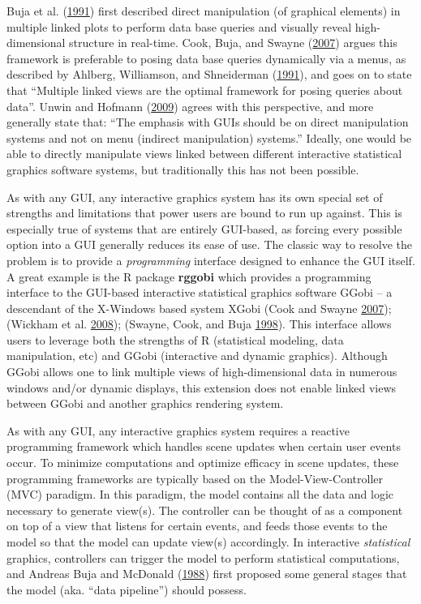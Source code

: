 \documentclass[12pt,]{isuthesis}
\begin{document}
Buja et al. (\protect\hyperlink{ref-Buja:1991vh}{1991}) first described
direct manipulation (of graphical elements) in multiple linked plots to
perform data base queries and visually reveal high-dimensional structure
in real-time. Cook, Buja, and Swayne
(\protect\hyperlink{ref-Cook:2007uk}{2007}) argues this framework is
preferable to posing data base queries dynamically via a menus, as
described by Ahlberg, Williamson, and Shneiderman
(\protect\hyperlink{ref-Ahlberg:1991}{1991}), and goes on to state that
``Multiple linked views are the optimal framework for posing queries
about data''. Unwin and Hofmann
(\protect\hyperlink{ref-Unwin:1999vp}{2009}) agrees with this
perspective, and more generally state that: ``The emphasis with GUIs
should be on direct manipulation systems and not on menu (indirect
manipulation) systems.'' Ideally, one would be able to directly
manipulate views linked between different interactive statistical
graphics software systems, but traditionally this has not been possible.

As with any GUI, any interactive graphics system has its own special set
of strengths and limitations that power users are bound to run up
against. This is especially true of systems that are entirely GUI-based,
as forcing every possible option into a GUI generally reduces its ease
of use. The classic way to resolve the problem is to provide a
\emph{programming} interface designed to enhance the GUI itself. A great
example is the R package \textbf{rggobi} which provides a programming
interface to the GUI-based interactive statistical graphics software
GGobi -- a descendant of the X-Windows based system XGobi (Cook and
Swayne \protect\hyperlink{ref-ggobi:2007}{2007}); (Wickham et al.
\protect\hyperlink{ref-rggobi}{2008}); (Swayne, Cook, and Buja
\protect\hyperlink{ref-xgobi}{1998}). This interface allows users to
leverage both the strengths of R (statistical modeling, data
manipulation, etc) and GGobi (interactive and dynamic graphics).
Although GGobi allows one to link multiple views of high-dimensional
data in numerous windows and/or dynamic displays, this extension does
not enable linked views between GGobi and another graphics rendering
system.

As with any GUI, any interactive graphics system requires a reactive
programming framework which handles scene updates when certain user
events occur. To minimize computations and optimize efficacy in scene
updates, these programming frameworks are typically based on the
Model-View-Controller (MVC) paradigm. In this paradigm, the model
contains all the data and logic necessary to generate view(s). The
controller can be thought of as a component on top of a view that
listens for certain events, and feeds those events to the model so that
the model can update view(s) accordingly. In interactive
\emph{statistical} graphics, controllers can trigger the model to
perform statistical computations, and Andreas Buja and McDonald
(\protect\hyperlink{ref-viewing-pipeline}{1988}) first proposed some
general stages that the model (aka. ``data pipeline'') should possess.
\end{document}
